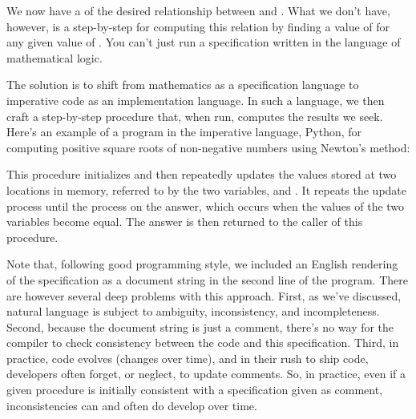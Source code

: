 \documentclass[letterpaper,10pt,english]{sphinxmanual}
\begin{document}
We now have a  of the desired relationship
between  and . What we don’t have, however, is a step-by-step
 for computing this relation by finding a value of  for
any given value of . You can’t just run a specification written in
the language of mathematical logic.

The solution is to shift from mathematics as a specification language
to imperative code as an implementation language.  In such a language,
we then craft a step-by-step procedure that, when run, computes the
results we seek. Here’s an example of a program in the imperative
language, Python, for computing positive square roots of non-negative
numbers using Newton’s method:

\begin{sphinxVerbatim}[commandchars=\\\{\}]
 
      
     
          
           
          
     
\end{sphinxVerbatim}

This procedure initializes and then repeatedly updates the values
stored at two locations in memory, referred to by the two variables,
 and . It repeats the update process until the
process  on the answer, which occurs when the values of the
two variables become equal. The answer is then returned to the caller
of this procedure.

Note that, following good programming style, we included an English
rendering of the specification as a document string in the second line
of the program.  There are however several deep problems with this
approach. First, as we’ve discussed, natural language is subject to
ambiguity, inconsistency, and incompleteness. Second, because the
document string is just a comment, there’s no way for the compiler to
check consistency between the code and this specification. Third, in
practice, code evolves (changes over time), and in their rush to ship
code, developers often forget, or neglect, to update comments. So, in
practice, even if a given procedure is initially consistent with a
specification given as comment, inconsistencies can and often do
develop over time.
\end{document}
